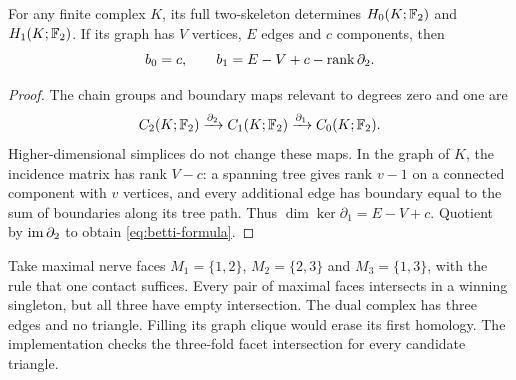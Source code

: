 \begin{proposition}\label{prop:two-skeleton}
For any finite complex $K$, its full two-skeleton determines $H_0(K;\mathbb F_2)$ and $H_1(K;\mathbb F_2)$. If its graph has $V$ vertices, $E$ edges and $c$ components, then
\begin{equation}\label{eq:betti-formula}
b_0=c,\qquad b_1=E-V+c-\operatorname{rank}\partial_2.
\end{equation}
\end{proposition}
\begin{proof}
The chain groups and boundary maps relevant to degrees zero and one are
\[
C_2(K;\mathbb F_2)\xrightarrow{\partial_2}C_1(K;\mathbb F_2)\xrightarrow{\partial_1}C_0(K;\mathbb F_2).
\]
Higher-dimensional simplices do not change these maps. In the graph of $K$, the incidence matrix has rank $V-c$: a spanning tree gives rank $v-1$ on a connected component with $v$ vertices, and every additional edge has boundary equal to the sum of boundaries along its tree path. Thus $\dim\ker\partial_1=E-V+c$. Quotient by $\operatorname{im}\partial_2$ to obtain \cref{eq:betti-formula}.
\end{proof}

\begin{example}
Take maximal nerve faces $M_1=\{1,2\}$, $M_2=\{2,3\}$ and $M_3=\{1,3\}$, with the rule that one contact suffices. Every pair of maximal faces intersects in a winning singleton, but all three have empty intersection. The dual complex has three edges and no triangle. Filling its graph clique would erase its first homology. The implementation checks the three-fold facet intersection for every candidate triangle.
\end{example}
